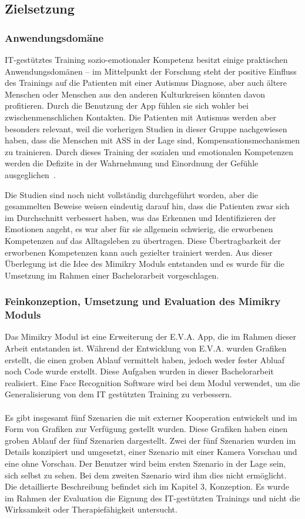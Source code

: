\subsection{Zielsetzung}
\subsubsection{Anwendungsdomäne}
IT-gestütztes Training sozio-emotionaler Kompetenz besitzt einige praktischen Anwendungsdomänen – im Mittelpunkt der Forschung steht der positive Einfluss des Trainings auf die Patienten mit einer Autismus Diagnose, aber auch ältere Menschen oder Menschen aus den anderen Kulturkreisen könnten davon profitieren. Durch die Benutzung der App fühlen sie sich wohler bei zwischenmenschlichen Kontakten. 
Die Patienten mit Autismus werden aber besonders relevant, weil die vorherigen Studien in dieser Gruppe nachgewiesen haben, dass die Menschen mit ASS in der Lage sind, Kompensationsmechanismen zu trainieren. Durch dieses Training der sozialen und emotionalen Kompetenzen werden die Defizite in der Wahrnehmung und Einordnung der Gefühle ausgeglichen~\cite{Zoerner.2017}. 

Die Studien sind noch nicht vollständig durchgeführt worden, aber die gesammelten Beweise weisen eindeutig darauf hin, dass die Patienten zwar sich im Durchschnitt verbessert haben, was das Erkennen und Identifizieren der Emotionen angeht, es war aber für sie allgemein schwierig, die erworbenen Kompetenzen auf das Alltagsleben zu übertragen. Diese Übertragbarkeit der erworbenen Kompetenzen kann auch gezielter trainiert werden. Aus dieser Überlegung ist die Idee des Mimikry Moduls entstanden und es wurde für die Umsetzung im Rahmen einer Bachelorarbeit vorgeschlagen.

\subsubsection{Feinkonzeption, Umsetzung und Evaluation des Mimikry Moduls}
Das Mimikry Modul ist eine Erweiterung der E.V.A. App, die im Rahmen dieser Arbeit entstanden ist. Während der Entwicklung von E.V.A. wurden Grafiken erstellt, die einen groben Ablauf vermittelt haben, jedoch weder fester Abluaf noch Code wurde erstellt. Diese Aufgaben wurden in dieser Bachelorarbeit realisiert. Eine Face Recognition Software wird bei dem Modul verwendet, um die Generalisierung von dem IT gestützten Training zu verbessern. \\\\
Es gibt insgesamt fünf Szenarien die mit externer Kooperation entwickelt und im Form von Grafiken zur Verfügung gestellt wurden. Diese Grafiken haben einen groben Ablauf der fünf Szenarien dargestellt. Zwei der fünf  Szenarien wurden im Details konzipiert und umgesetzt, einer Szenario mit einer Kamera Vorschau und eine ohne Vorschau. Der Benutzer wird beim ersten Szenario in der Lage sein, sich selbst zu sehen. Bei dem zweiten Szenario wird ihm dies nicht ermöglicht. Die detaillierte Beschreibung befindet sich im Kapitel 3, Konzeption.
Es wurde im Rahmen der Evaluation die Eignung des IT-gestützten Trainings und nicht die Wirksamkeit oder Therapiefähigkeit untersucht.

